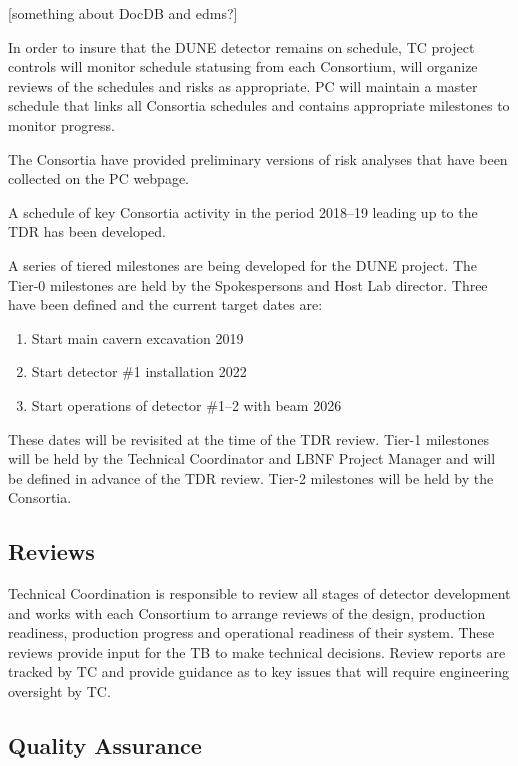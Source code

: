 [something about DocDB and edms?]

In order to insure that the DUNE detector remains on schedule, TC
project controls will monitor schedule statusing from each Consortium,
will organize reviews of the schedules and risks as appropriate. PC
will maintain a master schedule that links all Consortia schedules and
contains appropriate milestones to monitor progress.

The Consortia have provided preliminary versions of risk analyses that
have been collected on the PC webpage.

A schedule of key Consortia activity in the period 2018--19 leading up
to the TDR has been developed.

A series of tiered milestones are being developed for the DUNE
project. The Tier-0 milestones are held by the Spokespersons and Host
Lab director. Three have been defined and the current target dates
are:
\begin{enumerate}
\item Start main cavern excavation \hspace{2.1in} 2019
\item Start detector \#1 installation \hspace{2.1in} 2022
\item Start operations of detector \#1--2 with beam \hspace{1in} 2026
\end{enumerate}
These dates will be revisited at the time of the TDR review.  Tier-1
milestones will be held by the Technical Coordinator and LBNF Project
Manager and will be defined in advance of the TDR review. Tier-2
milestones will be held by the Consortia.

\subsection{Reviews}
\label{sec:fdsp-coord-reviews}

Technical Coordination is responsible to review all stages of detector
development and works with each Consortium to arrange reviews of the
design, production readiness, production progress and operational
readiness of their system.  These reviews provide input for the TB to
make technical decisions.  Review reports are tracked by TC and
provide guidance as to key issues that will require engineering
oversight by TC.

\subsection{Quality Assurance}
\label{sec:fdsp-coord-qa}


